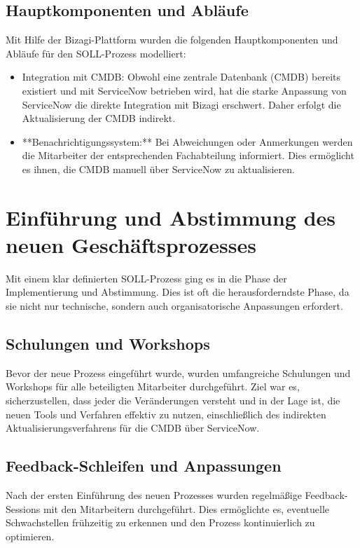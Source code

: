 \documentclass[12pt, a4paper]{article}
\begin{document}
\subsection{Hauptkomponenten und Abläufe}

Mit Hilfe der Bizagi-Plattform wurden die folgenden Hauptkomponenten und Abläufe für den SOLL-Prozess modelliert:

\begin{itemize}
\item Integration mit CMDB: Obwohl eine zentrale Datenbank (CMDB) bereits existiert und mit ServiceNow betrieben wird, hat die starke Anpassung von ServiceNow die 
direkte Integration mit Bizagi erschwert. Daher erfolgt die Aktualisierung der CMDB indirekt.
\item **Benachrichtigungssystem:** Bei Abweichungen oder Anmerkungen werden die Mitarbeiter der entsprechenden Fachabteilung informiert. Dies ermöglicht es ihnen, die 
CMDB manuell über ServiceNow zu aktualisieren.
\end{itemize}

\section{Einführung und Abstimmung des neuen Geschäftsprozesses}

Mit einem klar definierten SOLL-Prozess ging es in die Phase der Implementierung und Abstimmung. Dies ist oft die herausforderndste Phase, da sie nicht nur technische, 
sondern auch organisatorische Anpassungen erfordert.

\subsection{Schulungen und Workshops}

Bevor der neue Prozess eingeführt wurde, wurden umfangreiche Schulungen und Workshops für alle beteiligten Mitarbeiter durchgeführt. Ziel war es, sicherzustellen, 
dass jeder die Veränderungen versteht und in der Lage ist, die neuen Tools und Verfahren effektiv zu nutzen, einschließlich des indirekten Aktualisierungsverfahrens für die 
CMDB über ServiceNow.

\subsection{Feedback-Schleifen und Anpassungen}

Nach der ersten Einführung des neuen Prozesses wurden regelmäßige Feedback-Sessions mit den Mitarbeitern durchgeführt. Dies ermöglichte es, eventuelle Schwachstellen 
frühzeitig zu erkennen und den Prozess kontinuierlich zu optimieren.
\end{document}
